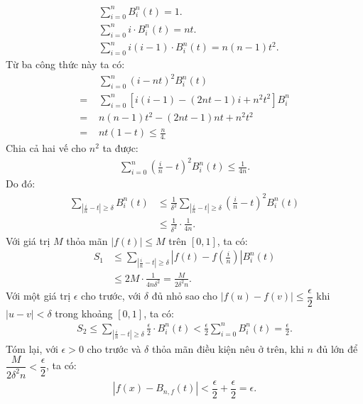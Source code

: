 \begin{multicols}{2}
	\begin{align*}
		&\sum\limits_{i = 0}^n {B_i^n(t) = 1}.\\
		&\sum\limits_{i = 0}^n {i \cdot B_i^n(t) = nt.}\\
		&\sum\limits_{i = 0}^n {i(i - 1) \cdot B_i^n(t) = n(n - 1){t^2}.}
	\end{align*}
	Từ ba công thức này ta có:
	\begin{align*}
		&\sum\limits_{i = 0}^n {{{(i - nt)}^2}B_i^n(t)} \\
		=\,\, &\sum\limits_{i = 0}^n \left[ {i(i - 1) - (2nt - 1)i + {n^2}{t^2}} \right]B_i^n \\
		= \,\,&n(n - 1){t^2} - (2nt - 1)nt + {n^2}{t^2} \\
		= \,\,&nt(1 - t) \le \frac{n}{{4.}}
	\end{align*}
	Chia cả hai vế cho $n^2$ ta được:
	\begin{align*}
		\sum\limits_{i = 0}^n {{{\left( {\frac{i}{n} - t} \right)}^2}B_i^n(t) \le \frac{1}{{4n}}.}
	\end{align*}
	Do đó:
	\begin{align*}
		\sum\limits_{\left| {\frac{i}{n} - t} \right| \ge \delta } {B_i^n(t)} &\le  \frac{1}{{{\delta ^2}}}\sum\limits_{\left| {\frac{i}{n} - t} \right| \ge \delta } {{\left( {\frac{i}{n} - t} \right)}^2}B_i^n(t) \\
		&\le \frac{1}{{{\delta ^2}}} \cdot \frac{1}{{4n}}.
	\end{align*}
	Với giá trị $M$ thỏa mãn $|f(t)| \le M$ trên $[0,1]$, ta có:
	\begin{align*}
		{S_1} &\le \sum\limits_{\left| {\frac{i}{n} - t} \right| \ge \delta } \left| {f(t) - f\left( {\frac{i}{n}} \right)} \right|B_i^n(t) \\
			&\le 2M \cdot \frac{1}{{4n{\delta ^2}}} = \frac{M}{{2{\delta ^2}n}}.
	\end{align*}
	Với một giá trị $\epsilon$ cho trước, với $\delta$ đủ nhỏ sao cho $|f(u)-f(v)| \le \dfrac{\epsilon}{2}$ khi $|u-v|< \delta$ trong khoảng $[0,1]$, ta có:
	\begin{align*}
		{S_2} \le \sum\limits_{\left| {\frac{i}{n} - t} \right| \ge \delta } {\frac{\epsilon}{2} \cdot B_i^n(t)}  < \frac{\epsilon}{2}\sum\limits_{i = 0}^n {B_i^n(t) = \frac{\epsilon}{2}}.
	\end{align*}
	Tóm lại, với $\epsilon>0$ cho trước và $\delta$ thỏa mãn điều kiện nêu ở trên, khi $n$ đủ lớn để $\dfrac{M}{2\delta^2n} < \dfrac{\epsilon}{2}$, ta có:
	\begin{align*}
		|f(x)- B_{n,f}(t)| < \dfrac{\epsilon}{2} + \dfrac{\epsilon}{2} = \epsilon.

\end{align*}
\end{multicols}
